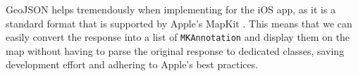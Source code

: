 GeoJSON helps tremendously when implementing for the iOS app, as it is a standard format that is supported by Apple's MapKit \cite{mkgeojsonobject}. This means that we can easily convert the response into a list of \lstinline{MKAnnotation} and display them on the map without having to parse the original response to dedicated classes, saving development effort and adhering to Apple's best practices.